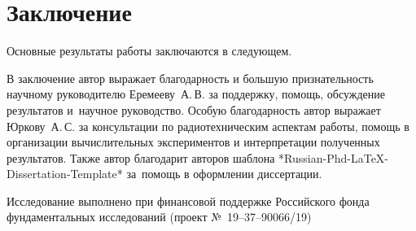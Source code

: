 \chapter*{Заключение}                       %


Основные результаты работы заключаются в следующем.


В заключение автор выражает благодарность и большую признательность научному руководителю
Еремееву~А.\,В. за поддержку, помощь, обсуждение результатов и~научное
руководство. Особую благодарность автор выражает Юркову~А.\,С. за консультации по радиотехническим аспектам работы, помощь в организации вычислительных экспериментов и интерпретации полученных результатов. Также автор благодарит авторов шаблона
*Russian-Phd-LaTeX-Dissertation-Template* за~помощь в оформлении
диссертации.

Исследование выполнено при финансовой поддержке Российского фонда фундаментальных исследований (проект №~19--37--90066/19)